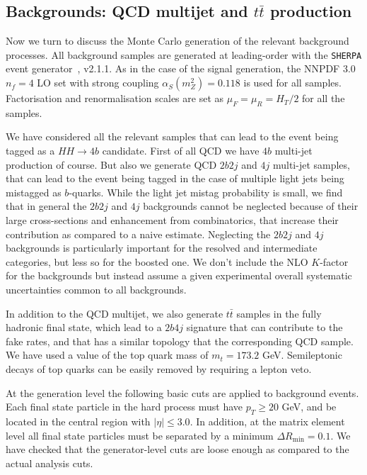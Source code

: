 \subsection{Backgrounds: QCD multijet and $t\bar{t}$ production}

Now we turn to discuss the Monte Carlo generation of the relevant background processes.
%
All background samples are generated at leading-order
with the {\tt SHERPA} event generator~\cite{Gleisberg:2008ta}, v2.1.1.
%
As in the case of the signal generation, the NNPDF 3.0 $n_f = 4$ LO set with strong coupling $\alpha_S(m_Z^2)=0.118$ is used for all samples.
%
Factorisation and renormalisation scales are set as $\mu_F=\mu_R=H_T/2$ for all
the samples.

We have considered all the relevant samples that can lead to the event
being tagged as a $HH\to 4b$ candidate.
%
First of all QCD we have $4b$ multi-jet production of course.
%
But also we generate QCD $2b2j$ and $4j$ multi-jet samples,
that can lead to the event being tagged in the case of multiple light
jets being mistagged as $b$-quarks.
%
While the light jet mistag probability is small, we find that
in general the $2b2j$ and $4j$ backgrounds cannot be neglected because
of their large cross-sections and enhancement from combinatorics, that
increase their contribution as compared to a naive estimate.
%
Neglecting the  $2b2j$ and $4j$ backgrounds is particularly
important for the resolved and intermediate categories, but less
so for the boosted one.
%
We don't include the NLO $K$-factor for the backgrounds but instead assume
a given experimental overall systematic uncertainties common to all backgrounds.

In addition to the QCD multijet, we also generate $t\bar{t}$ samples
in the fully hadronic final state, which lead to a $2b4j$ signature that can
contribute to the fake rates, and that has a similar topology that
the corresponding QCD sample.
%
We have used a value of the top quark mass of $m_t=173.2$ GeV.
%
Semileptonic decays of top quarks can be easily removed by requiring
a lepton veto.


At the generation level the following basic cuts are applied to
background events.
%
Each final state particle in the hard process must have $p_T \ge 20$ GeV, and be located
in the central region with
$| \eta | \le 3.0$.
%
In addition, at the matrix element level
all final state particles must be separated by a minimum $\Delta R_{\mathrm{min}} =0.1$.
%
We have checked that the generator-level cuts are loose enough as compared to the actual
analysis cuts.
%


